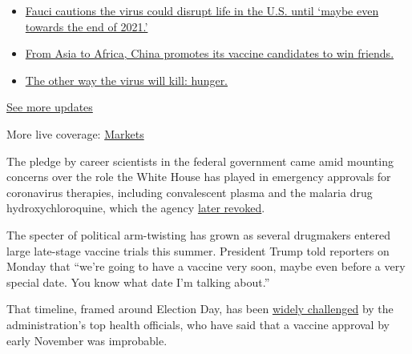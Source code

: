 \begin{itemize}
\tightlist
\item
  \href{https://www.nytimes3xbfgragh.onion/2020/09/11/world/covid-19-coronavirus.html?action=click\&pgtype=Article\&state=default\&region=MAIN_CONTENT_1\&context=storylines_live_updates\#link-dfb8a16}{Fauci
  cautions the virus could disrupt life in the U.S. until `maybe even
  towards the end of 2021.'}
\item
  \href{https://www.nytimes3xbfgragh.onion/2020/09/11/world/covid-19-coronavirus.html?action=click\&pgtype=Article\&state=default\&region=MAIN_CONTENT_1\&context=storylines_live_updates\#link-7104d154}{From
  Asia to Africa, China promotes its vaccine candidates to win friends.}
\item
  \href{https://www.nytimes3xbfgragh.onion/2020/09/11/world/covid-19-coronavirus.html?action=click\&pgtype=Article\&state=default\&region=MAIN_CONTENT_1\&context=storylines_live_updates\#link-393ad215}{The
  other way the virus will kill: hunger.}
\end{itemize}

\href{https://www.nytimes3xbfgragh.onion/2020/09/11/world/covid-19-coronavirus.html?action=click\&pgtype=Article\&state=default\&region=MAIN_CONTENT_1\&context=storylines_live_updates}{See
more updates}

More live coverage:
\href{https://www.nytimes3xbfgragh.onion/live/2020/09/11/business/stock-market-today-coronavirus?action=click\&pgtype=Article\&state=default\&region=MAIN_CONTENT_1\&context=storylines_live_updates}{Markets}

The pledge by career scientists in the federal government came amid
mounting concerns over the role the White House has played in emergency
approvals for coronavirus therapies, including convalescent plasma and
the malaria drug hydroxychloroquine, which the agency
\href{https://www.nytimes3xbfgragh.onion/2020/06/15/health/fda-hydroxychloroquine-malaria.html}{later
revoked}.

The specter of political arm-twisting has grown as several drugmakers
entered large late-stage vaccine trials this summer. President Trump
told reporters on Monday that ``we're going to have a vaccine very soon,
maybe even before a very special date. You know what date I'm talking
about.''

That timeline, framed around Election Day, has been
\href{https://www.nytimes3xbfgragh.onion/2020/09/04/science/covid-vaccine-pharma-pledge.html}{widely
challenged} by the administration's top health officials, who have said
that a vaccine approval by early November was improbable.

